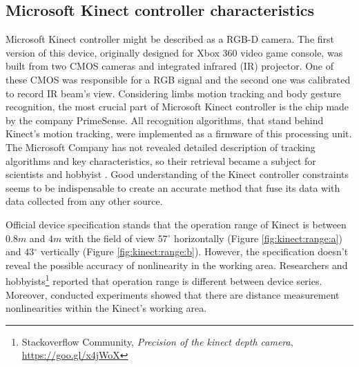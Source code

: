 \documentclass[sensors,article,submit,moreauthors,pdftex,10pt,a4paper]{mdpi}
\newcommand{\degree}{\ensuremath{{}^{\circ}}\xspace}
\begin{document}

\subsection{Microsoft Kinect controller characteristics}
Microsoft Kinect controller might be described as a RGB-D camera. The first version of this device, originally designed for Xbox 360 video game console, was built from two CMOS cameras and integrated infrared (IR) projector. One of these CMOS was responsible for a RGB signal and the second one was calibrated to record IR beam’s view. Considering limbs motion tracking and body gesture recognition, the most crucial part of Microsoft Kinect controller is the chip made by the company PrimeSense. All recognition algorithms, that stand behind Kinect’s motion tracking, were implemented as a firmware of this processing unit. 
The Microsoft Company has not revealed detailed description of tracking algorithms and key characteristics, so their retrieval became a subject for scientists and hobbyist \cite{Skalski2015,Gonzalez-Jorge2013,Khoshelham2012}. Good understanding of the Kinect controller constraints seems to be indispensable to create an accurate method that fuse its data with data collected from any other source. 

Official device specification stands that the operation range of Kinect is between $0.8m$ and $4m$ with the field of view $57\degree$ horizontally (Figure \ref{fig:kinect:range:a}) and $43\degree$ vertically (Figure \ref{fig:kinect:range:b}). However, the specification doesn't reveal the possible accuracy of nonlinearity in the working area. Researchers \cite{DiFilippo2015} and hobbyists\footnote{Stackoverflow Community, \textit{Precision of the kinect depth camera}, \url{https://goo.gl/x4jWoX}} reported that operation range is different between device series. Moreover, conducted experiments showed that there are distance measurement nonlinearities within the Kinect’s working area.
\end{document}
